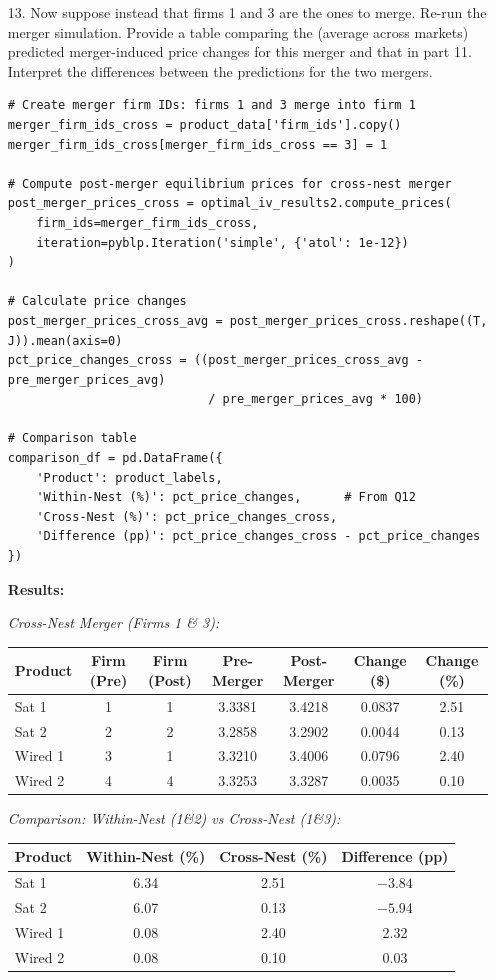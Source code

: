 \documentclass[english,11pt]{article}
\begin{document}
\begin{enumerate}
\item[13.] Now suppose instead that firms 1 and 3 are the ones to merge.
Re-run the merger simulation. Provide a table comparing the (average
across markets) predicted merger-induced price changes for this merger and
that in part 11. Interpret the differences between the predictions for the
two mergers.

\begin{verbatim}
# Create merger firm IDs: firms 1 and 3 merge into firm 1
merger_firm_ids_cross = product_data['firm_ids'].copy()
merger_firm_ids_cross[merger_firm_ids_cross == 3] = 1

# Compute post-merger equilibrium prices for cross-nest merger
post_merger_prices_cross = optimal_iv_results2.compute_prices(
    firm_ids=merger_firm_ids_cross,
    iteration=pyblp.Iteration('simple', {'atol': 1e-12})
)

# Calculate price changes
post_merger_prices_cross_avg = post_merger_prices_cross.reshape((T, J)).mean(axis=0)
pct_price_changes_cross = ((post_merger_prices_cross_avg - pre_merger_prices_avg) 
                            / pre_merger_prices_avg * 100)

# Comparison table
comparison_df = pd.DataFrame({
    'Product': product_labels,
    'Within-Nest (%)': pct_price_changes,      # From Q12
    'Cross-Nest (%)': pct_price_changes_cross,
    'Difference (pp)': pct_price_changes_cross - pct_price_changes
})
\end{verbatim}

\textbf{Results:}

\textit{Cross-Nest Merger (Firms 1 \& 3):}

\begin{center}
\begin{tabular}{lcccccc}
\hline
Product & Firm (Pre) & Firm (Post) & Pre-Merger & Post-Merger & Change (\$) & Change (\%) \\
\hline
Sat 1 & 1 & 1 & 3.3381 & 3.4218 & 0.0837 & 2.51 \\
Sat 2 & 2 & 2 & 3.2858 & 3.2902 & 0.0044 & 0.13 \\
Wired 1 & 3 & 1 & 3.3210 & 3.4006 & 0.0796 & 2.40 \\
Wired 2 & 4 & 4 & 3.3253 & 3.3287 & 0.0035 & 0.10 \\
\hline
\end{tabular}
\end{center}

\textit{Comparison: Within-Nest (1\&2) vs Cross-Nest (1\&3):}

\begin{center}
\begin{tabular}{lccc}
\hline
Product & Within-Nest (\%) & Cross-Nest (\%) & Difference (pp) \\
\hline
Sat 1 & 6.34 & 2.51 & $-3.84$ \\
Sat 2 & 6.07 & 0.13 & $-5.94$ \\
Wired 1 & 0.08 & 2.40 & 2.32 \\
Wired 2 & 0.08 & 0.10 & 0.03 \\
\hline
\end{tabular}
\end{center}


\end{enumerate}
\end{document}
